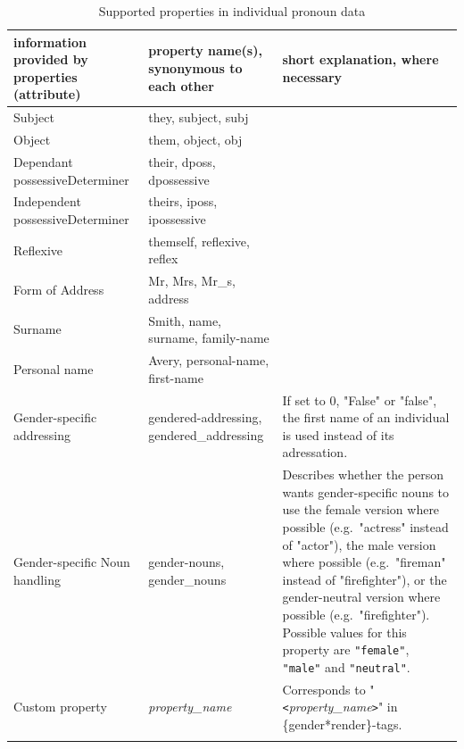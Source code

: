 \documentclass{article}
\begin{document}
    \begin{flushleft}
        \begin{center}
            \begin{longtable}{|>{\raggedright\arraybackslash}p{7em} | >{\raggedright\arraybackslash}p{9em} | >{\raggedright\arraybackslash}p{14em} |}
                 \hline
                 information provided by properties (attribute) & property name(s), \linebreak synonymous to each other & short explanation, where necessary\\
                 \hline\hline
                 Subject & they, subject, subj & \\
                 \hline
                 Object & them, object, obj & \\
                 \hline
                 Dependant possessive\linebreak Determiner & their, dposs, dpossessive & \\
                 \hline
                 Independent possessive\linebreak Determiner & theirs, iposs, ipossessive & \\
                 \hline
                 Reflexive & themself, reflexive, reflex & \\
                 \hline
                 \hline
                 Form of Address & Mr, Mrs, Mr\_s, address & \\
                 \hline
                 Surname & Smith, name, surname, family-name & \\
                 \hline
                 Personal name & Avery, personal-name, first-name & \\
                 \hline
                 \hline
                 Gender-specific addressing & gendered-addressing, gendered\_addressing & If set to 0, "False" or "false", the first name of an individual is used instead of its adressation.\\
                 \hline
                 Gender-specific Noun handling & gender-nouns, gender\_nouns & Describes whether the person wants gender-specific nouns to use the female version where possible (e.g.\ "actress" instead of "actor"), the male version where possible (e.g.\ "fireman" instead of "firefighter"), or the gender-neutral version where possible (e.g.\ "firefighter").
                 Possible values for this property are \texttt{"female"}, \texttt{"male"} and \texttt{"neutral"}. \\
                 \hline
                 \hline
                 Custom property & \emph{property\_name} & Corresponds to "\texttt{<}\emph{property\_name}\texttt{>}" in \{gender*render\}-tags. \\
                 \hline
                \caption{Supported properties in individual pronoun data}
            \end{longtable}
        \end{center}
    \end{flushleft}
\end{document}
